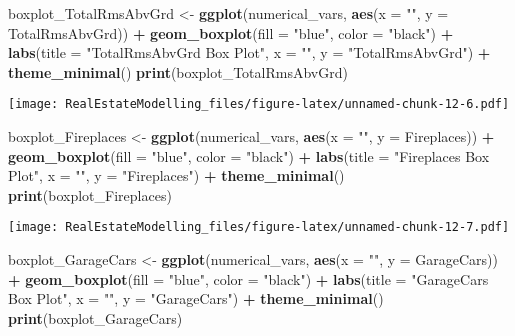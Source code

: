 \documentclass[
]{article}
\newenvironment{Shaded}{\begin{snugshade}}{\end{snugshade}}
\newcommand{\AttributeTok}[1]{\textcolor[rgb]{0.13,0.29,0.53}{#1}}
\newcommand{\FunctionTok}[1]{\textcolor[rgb]{0.13,0.29,0.53}{\textbf{#1}}}
\newcommand{\NormalTok}[1]{#1}
\newcommand{\OtherTok}[1]{\textcolor[rgb]{0.56,0.35,0.01}{#1}}
\newcommand{\SpecialCharTok}[1]{\textcolor[rgb]{0.81,0.36,0.00}{\textbf{#1}}}
\newcommand{\StringTok}[1]{\textcolor[rgb]{0.31,0.60,0.02}{#1}}
\begin{document}
\begin{Shaded}
\begin{Highlighting}[]
\NormalTok{boxplot\_TotalRmsAbvGrd }\OtherTok{\textless{}{-}} \FunctionTok{ggplot}\NormalTok{(numerical\_vars, }\FunctionTok{aes}\NormalTok{(}\AttributeTok{x =} \StringTok{""}\NormalTok{, }\AttributeTok{y =}\NormalTok{ TotalRmsAbvGrd)) }\SpecialCharTok{+}
  \FunctionTok{geom\_boxplot}\NormalTok{(}\AttributeTok{fill =} \StringTok{"blue"}\NormalTok{, }\AttributeTok{color =} \StringTok{"black"}\NormalTok{) }\SpecialCharTok{+}
  \FunctionTok{labs}\NormalTok{(}\AttributeTok{title =} \StringTok{"TotalRmsAbvGrd Box Plot"}\NormalTok{, }\AttributeTok{x =} \StringTok{""}\NormalTok{, }\AttributeTok{y =} \StringTok{"TotalRmsAbvGrd"}\NormalTok{) }\SpecialCharTok{+}
  \FunctionTok{theme\_minimal}\NormalTok{()}
\FunctionTok{print}\NormalTok{(boxplot\_TotalRmsAbvGrd)}
\end{Highlighting}
\end{Shaded}

\texttt{[image: RealEstateModelling\_files/figure-latex/unnamed-chunk-12-6.pdf]}

\begin{Shaded}
\begin{Highlighting}[]
\NormalTok{boxplot\_Fireplaces }\OtherTok{\textless{}{-}} \FunctionTok{ggplot}\NormalTok{(numerical\_vars, }\FunctionTok{aes}\NormalTok{(}\AttributeTok{x =} \StringTok{""}\NormalTok{, }\AttributeTok{y =}\NormalTok{ Fireplaces)) }\SpecialCharTok{+}
  \FunctionTok{geom\_boxplot}\NormalTok{(}\AttributeTok{fill =} \StringTok{"blue"}\NormalTok{, }\AttributeTok{color =} \StringTok{"black"}\NormalTok{) }\SpecialCharTok{+}
  \FunctionTok{labs}\NormalTok{(}\AttributeTok{title =} \StringTok{"Fireplaces Box Plot"}\NormalTok{, }\AttributeTok{x =} \StringTok{""}\NormalTok{, }\AttributeTok{y =} \StringTok{"Fireplaces"}\NormalTok{) }\SpecialCharTok{+}
  \FunctionTok{theme\_minimal}\NormalTok{()}
\FunctionTok{print}\NormalTok{(boxplot\_Fireplaces)}
\end{Highlighting}
\end{Shaded}

\texttt{[image: RealEstateModelling\_files/figure-latex/unnamed-chunk-12-7.pdf]}

\begin{Shaded}
\begin{Highlighting}[]
\NormalTok{boxplot\_GarageCars }\OtherTok{\textless{}{-}} \FunctionTok{ggplot}\NormalTok{(numerical\_vars, }\FunctionTok{aes}\NormalTok{(}\AttributeTok{x =} \StringTok{""}\NormalTok{, }\AttributeTok{y =}\NormalTok{ GarageCars)) }\SpecialCharTok{+}
  \FunctionTok{geom\_boxplot}\NormalTok{(}\AttributeTok{fill =} \StringTok{"blue"}\NormalTok{, }\AttributeTok{color =} \StringTok{"black"}\NormalTok{) }\SpecialCharTok{+}
  \FunctionTok{labs}\NormalTok{(}\AttributeTok{title =} \StringTok{"GarageCars Box Plot"}\NormalTok{, }\AttributeTok{x =} \StringTok{""}\NormalTok{, }\AttributeTok{y =} \StringTok{"GarageCars"}\NormalTok{) }\SpecialCharTok{+}
  \FunctionTok{theme\_minimal}\NormalTok{()}
\FunctionTok{print}\NormalTok{(boxplot\_GarageCars)}
\end{Highlighting}
\end{Shaded}
\end{document}
